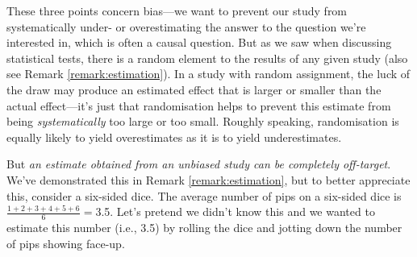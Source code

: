 \documentclass[a4paper]{tufte-book}\usepackage[]{graphicx}\usepackage[]{xcolor}
\begin{document}
These three points concern bias---we want to prevent our
study from systematically under- or overestimating the answer to
the question we're interested in, which is often a causal question. 
But as we saw when discussing
statistical tests, there is a random element to the results of any
given study (also see Remark \vref{remark:estimation}). 
In a study with random assignment, the luck of the draw
may produce an estimated effect that is larger or smaller than the actual
effect---it's just that randomisation helps to prevent
this estimate from being \emph{systematically} too large or too small.
Roughly speaking, randomisation is equally likely to yield overestimates as it is
to yield underestimates.

But \emph{an estimate obtained from an unbiased study can be completely off-target}.
We've demonstrated this in Remark \ref{remark:estimation},
but to better appreciate this, consider a six-sided dice. 
The average number of pips on a six-sided dice 
is $\frac{1+2+3+4+5+6}{6}=$3.5. Let's pretend
we didn't know this and we wanted to estimate this number (i.e., 3.5) by rolling
the dice and jotting down the number of pips showing face-up.
\end{document}
